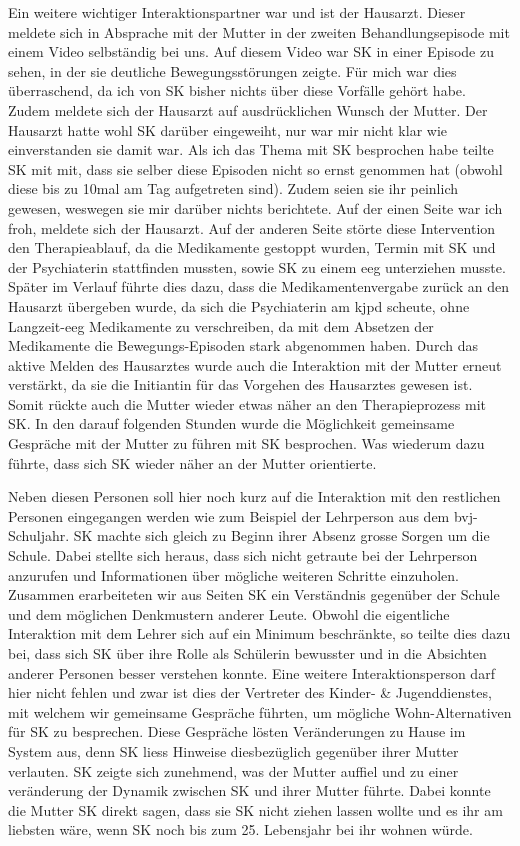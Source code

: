 Ein weitere wichtiger Interaktionspartner war und ist der Hausarzt. Dieser meldete sich in Absprache mit der Mutter in der zweiten Behandlungsepisode mit einem Video selbständig bei uns. Auf diesem Video war SK in einer Episode zu sehen, in der sie deutliche Bewegungsstörungen zeigte. Für mich war dies überraschend, da ich von SK bisher nichts über diese Vorfälle gehört habe. Zudem meldete sich der Hausarzt auf ausdrücklichen Wunsch der Mutter. Der Hausarzt hatte wohl SK darüber eingeweiht, nur war mir nicht klar wie einverstanden sie damit war. Als ich das Thema mit SK besprochen habe teilte SK mit mit, dass sie selber diese Episoden nicht so ernst genommen hat (obwohl diese bis zu 10mal am Tag aufgetreten sind). Zudem seien sie ihr peinlich gewesen, weswegen sie mir darüber nichts berichtete. Auf der einen Seite war ich froh, meldete sich der Hausarzt. Auf der anderen Seite störte diese Intervention den Therapieablauf, da die Medikamente gestoppt wurden, Termin mit SK und der Psychiaterin stattfinden mussten, sowie SK zu einem \ac{eeg} unterziehen musste. Später im Verlauf führte dies dazu, dass die Medikamentenvergabe zurück an den Hausarzt übergeben wurde, da sich die Psychiaterin am \ac{kjpd} scheute, ohne Langzeit-\ac{eeg} Medikamente zu verschreiben, da mit dem Absetzen der Medikamente die Bewegungs-Episoden stark abgenommen haben. Durch das aktive Melden des Hausarztes wurde auch die Interaktion mit der Mutter erneut verstärkt, da sie die Initiantin für das Vorgehen des Hausarztes gewesen ist. Somit rückte auch die Mutter wieder etwas näher an den Therapieprozess mit SK. In den darauf folgenden Stunden wurde die Möglichkeit gemeinsame Gespräche mit der Mutter zu führen mit SK besprochen. Was wiederum dazu führte, dass sich SK wieder näher an der Mutter orientierte.

Neben diesen Personen soll hier noch kurz auf die Interaktion mit den restlichen Personen eingegangen werden wie zum Beispiel der Lehrperson aus dem \ac{bvj}-Schuljahr. SK machte sich gleich zu Beginn ihrer Absenz grosse Sorgen um die Schule. Dabei stellte sich heraus, dass sich nicht getraute bei der Lehrperson anzurufen und Informationen über mögliche weiteren Schritte einzuholen. Zusammen erarbeiteten wir aus Seiten SK ein Verständnis gegenüber der Schule und dem möglichen Denkmustern anderer Leute. Obwohl die eigentliche Interaktion mit dem Lehrer sich auf ein Minimum beschränkte, so teilte dies dazu bei, dass sich SK über ihre Rolle als Schülerin bewusster und in die Absichten anderer Personen besser verstehen konnte. Eine weitere Interaktionsperson darf hier nicht fehlen und zwar ist dies der Vertreter des Kinder- \& Jugenddienstes, mit welchem wir gemeinsame Gespräche führten, um mögliche Wohn-Alternativen für SK zu besprechen. Diese Gespräche lösten Veränderungen zu Hause im System aus, denn SK liess Hinweise diesbezüglich gegenüber ihrer Mutter verlauten. SK zeigte sich zunehmend, was der Mutter auffiel und zu einer veränderung der Dynamik zwischen SK und ihrer Mutter führte. Dabei konnte die Mutter SK direkt sagen, dass sie SK nicht ziehen lassen wollte und es ihr am liebsten wäre, wenn SK noch bis zum 25. Lebensjahr bei ihr wohnen würde.

